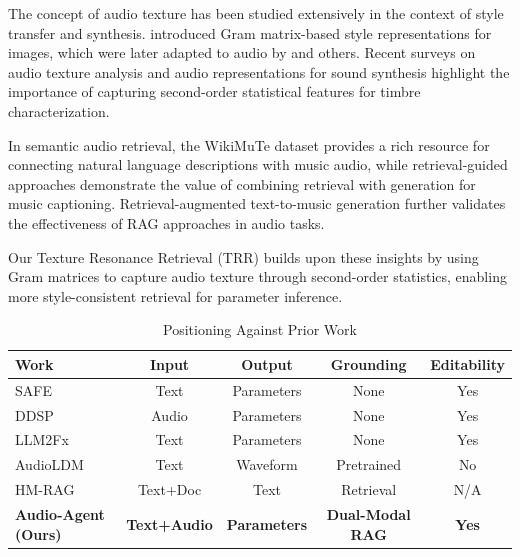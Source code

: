 \documentclass{article}
\begin{document}
The concept of audio texture has been studied extensively in the context of style transfer and synthesis. \citet{gatys2015style} introduced Gram matrix-based style representations for images, which were later adapted to audio by \citet{stylianou2015audio} and others. Recent surveys on audio texture analysis \citep{mcwec2023texture} and audio representations for sound synthesis \citep{verzotto2022representations} highlight the importance of capturing second-order statistical features for timbre characterization.

In semantic audio retrieval, the WikiMuTe dataset \citep{weck2023wikimute} provides a rich resource for connecting natural language descriptions with music audio, while retrieval-guided approaches \citep{srivatsan2024retrieval} demonstrate the value of combining retrieval with generation for music captioning. Retrieval-augmented text-to-music generation \citep{gonzales2024rag} further validates the effectiveness of RAG approaches in audio tasks.

Our Texture Resonance Retrieval (TRR) builds upon these insights by using Gram matrices to capture audio texture through second-order statistics, enabling more style-consistent retrieval for parameter inference.

\begin{table}[t]
	\centering
	\caption{Positioning Against Prior Work}
	\label{tab:positioning}
	\small
	\begin{tabular}{lcccc}
		\toprule
		\textbf{Work}               & \textbf{Input}      & \textbf{Output}     & \textbf{Grounding}      & \textbf{Editability} \\
		\midrule
		SAFE \citep{stables2014semantic}             & Text                                 & Parameters                           & None                                     & Yes                                   \\
		DDSP \citep{engel2020ddsp}                   & Audio                                & Parameters                           & None                                     & Yes                                   \\
		LLM2Fx \citep{doh2025llm2fx}                 & Text                                 & Parameters                           & None                                     & Yes                                   \\
		AudioLDM \citep{liu2023audioldm}             & Text                                 & Waveform                             & Pretrained                               & No                                    \\
		HM-RAG \citep{liu2025hmrag}                  & Text+Doc                             & Text                                 & Retrieval                                & N/A                                   \\
		\midrule
		\textbf{Audio-Agent (Ours)} & \textbf{Text+Audio} & \textbf{Parameters} & \textbf{Dual-Modal RAG} & \textbf{Yes}         \\
		\bottomrule
	\end{tabular}
\end{table}
\end{document}
